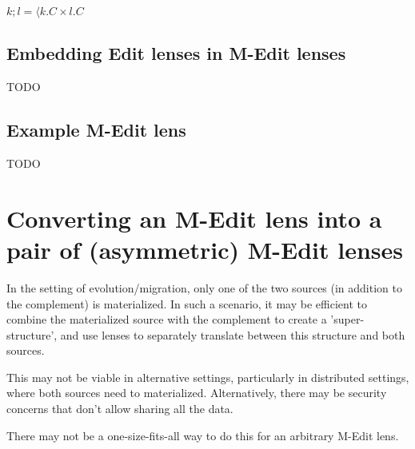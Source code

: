 \documentclass[a4paper,10pt]{article}
\begin{document}
$k;l = \langle k.C \times l.C$



\subsection{Embedding Edit lenses in M-Edit lenses}
TODO

\subsection{Example M-Edit lens}
TODO

\section{Converting an M-Edit lens into a pair of (asymmetric) M-Edit lenses}
In the setting of evolution/migration, only one of the two sources (in addition to the complement) is materialized. In such a scenario, it may be efficient to combine the materialized source with the complement to create a 'super-structure', and use lenses to separately translate between this structure and both sources. 

This may not be viable in alternative settings, particularly in distributed settings, where both sources need to materialized. Alternatively, there may be security concerns that don't allow sharing all the data.

There may not be a one-size-fits-all way to do this for an arbitrary M-Edit lens.
\end{document}
